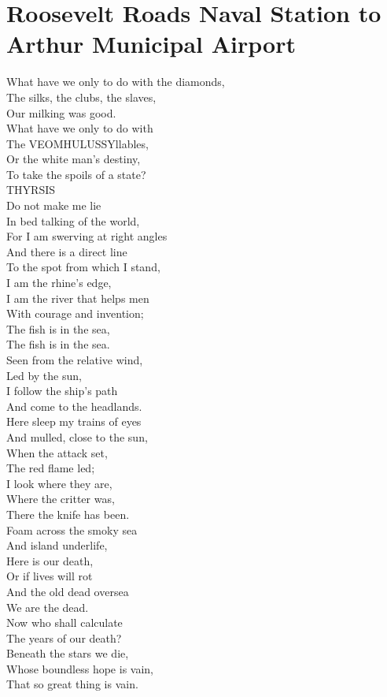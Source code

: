 \documentclass[smalldemyvopaper,11pt,twoside,onecolumn,openright,extrafontsizes]{memoir}
\begin{document}
\chapter{Roosevelt Roads Naval Station to Arthur Municipal Airport}
What have we only to do with the diamonds,
\\The silks, the clubs, the slaves,
\\Our milking was good.
\\What have we only to do with
\\The VEOMHULUSSYllables,
\\Or the white man's destiny,
\\To take the spoils of a state?
\\THYRSIS
\\Do not make me lie
\\In bed talking of the world,
\\For I am swerving at right angles
\\And there is a direct line
\\To the spot from which I stand,
\\I am the rhine's edge,
\\I am the river that helps men
\\With courage and invention;
\\The fish is in the sea,
\\The fish is in the sea.
\\Seen from the relative wind,
\\Led by the sun,
\\I follow the ship's path
\\And come to the headlands.
\\Here sleep my trains of eyes
\\And mulled, close to the sun,
\\When the attack set,
\\The red flame led;
\\I look where they are,
\\Where the critter was,
\\There the knife has been.
\\Foam across the smoky sea
\\And island underlife,
\\Here is our death,
\\Or if lives will rot
\\And the old dead oversea
\\We are the dead.
\\Now who shall calculate
\\The years of our death?
\\Beneath the stars we die,
\\Whose boundless hope is vain,
\\That so great thing is vain.
\end{document}
